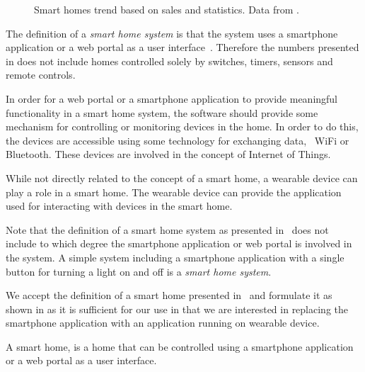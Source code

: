 \begin{figure}[!hbt]
  \centering
  
  \caption{Smart homes trend based on sales and statistics. Data from \protect\cite{SMARTHOMETREND}.}
  \label{fig:smarthomestrend}
\end{figure}

The definition of a \emph{smart home system} is  that the system uses a smartphone application or a web portal as a user interface~\cite{SMARTHOMETREND}. Therefore the numbers presented in  does not include homes controlled solely by switches, timers, sensors and remote controls.

In order for a web portal or a smartphone application to provide meaningful functionality in a smart home system, the software should provide some mechanism for controlling or monitoring devices in the home. In order to do this, the devices are accessible using some technology for exchanging data, \eg~WiFi or Bluetooth. These devices are involved in the concept of Internet of Things. 

While not directly related to the concept of a smart home, a wearable device can play a role in a smart home. The wearable device can provide the application used for interacting with devices in the smart home.

Note that the definition of a smart home system as presented in~\cite{SMARTHOMETREND} does not include to which degree the smartphone application or web portal is involved in the system. A simple system including a smartphone application with a single button for turning a light on and off is a \emph{smart home system}.

We accept the definition of a smart home presented in~\cite{SMARTHOMETREND} and formulate it as shown in  as it is sufficient for our use in that we are interested in replacing the smartphone application with an application running on wearable device.

\begin{definition}
\label{def:smarthome}
A smart home, is a home that can be controlled using a smartphone application or a web portal as a user interface.
\end{definition}

